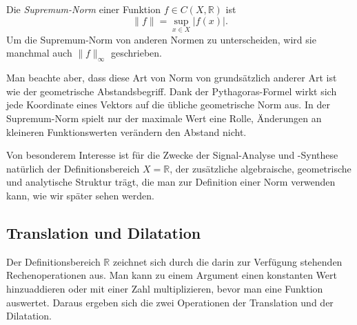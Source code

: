 \begin{definition}
Die {\em Supremum-Norm} einer Funktion $f\in C(X,\mathbb R)$ ist
%
\[
\|f\| = \sup_{x\in X} |f(x)|.
\]
Um die Supremum-Norm von anderen Normen zu unterscheiden, wird sie
manchmal auch $\|f\|_{\infty}$ geschrieben.
\end{definition}

Man beachte aber, dass diese Art von Norm von grundsätzlich anderer Art
ist wie der geometrische Abstandsbegriff.
Dank der Pythagoras-Formel wirkt sich jede Koordinate eines Vektors 
auf die übliche geometrische Norm aus.
In der Supremum-Norm spielt nur der maximale Wert eine Rolle,
Änderungen an kleineren Funktionswerten verändern den Abstand nicht.

Von besonderem Interesse ist für die Zwecke der Signal-Analyse und
-Synthese natürlich der Definitionsbereich $X=\mathbb{R}$, der
zusätzliche algebraische, geometrische und analytische Struktur trägt, die man
zur Definition einer Norm verwenden kann, wie wir später sehen werden.

\subsection{Translation und Dilatation\label{subsection:translation-dilatation}}
Der Definitionsbereich $\mathbb R$ zeichnet sich durch die darin zur
Verfügung stehenden Rechenoperationen aus.
Man kann zu einem Argument einen konstanten Wert hinzuaddieren oder mit
einer Zahl multiplizieren, bevor man eine Funktion auswertet.
Daraus ergeben sich die zwei Operationen der Translation und der Dilatation.
%
%

